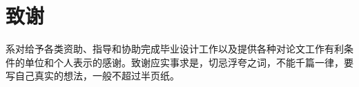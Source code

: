 \chapter*{致\quad 谢}
\par{系对给予各类资助、指导和协助完成毕业设计工作以及提供各种对论文工作有利条件的单位和个人表示的感谢。致谢应实事求是，切忌浮夸之词，不能千篇一律，要写自己真实的想法，一般不超过半页纸。}


